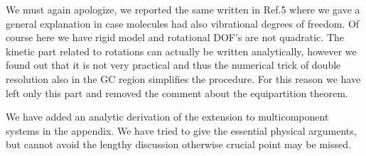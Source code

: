 \documentclass[12pt]{article}
\begin{document}
{\color{blue}{\it On page 5, the authors indicate that equipartition
    implies a contribution to the chemical potential of 1/2 kT for
    each atomic degree of freedom (dof). I would expect that this
    would be true if each atomic dof contributes quadratically to the
    Hamiltonian. It would be helpful if the authors could clarify why
    this would be so for dof's that do not contribute quadratically to
    the Hamiltonian.}}

We must again apologize, we reported the same written in Ref.5 where
we gave a general explanation in case molecules had also vibrational
degrees of freedom. Of course here we have rigid model and rotational
DOF's are not quadratic. The kinetic part related to rotations can
actually be written analytically, however we found out that it is not
very practical and thus the numerical trick of double resolution also
in the GC region simplifies the procedure.  For this reason we have
left only this part and removed the comment about the equipartition
theorem.

{\color{blue}{\it  It would be helpful if the authors could clarify why/how eq 3 generalizes to eq 4 in the case of a multicomponent system}}

We have added an analytic derivation of the extension to
multicomponent systems in the appendix.  We have tried to give the
essential physical arguments, but cannot avoid the lengthy discussion
otherwise crucial point may be missed.

 
\end{document}
